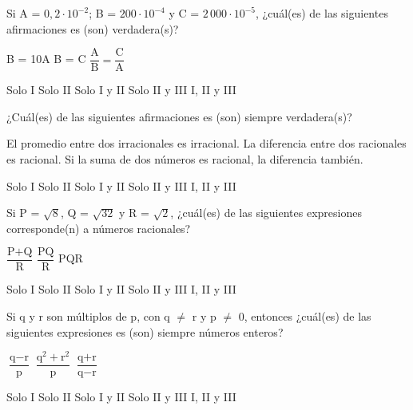 \documentclass[pagina vacia]{srs}
\begin{document}
\begin{preguntas}[after-item-skip=1cm]
\pregunta Si A = \(0,2 \cdot 10^{-2}\); B = \(200 \cdot 10^{-4}\) y C = \(2\,000 \cdot 10^{-5}\), ¿cuál(es) de las siguientes afirmaciones es (son) verdadera(s)?
\begin{verticali}
\alternativa B = 10A
\alternativa B = C
\alternativa \( \dfrac{\text{A}}{\text{B}} = \dfrac{\text{C}}{\text{A}} \)
\end{verticali}
\begin{vertical}
\alternativa Solo I
\alternativa Solo II
\alternativa Solo I y II
\alternativa Solo II y III
\alternativa I, II y III
\end{vertical}

\pregunta ¿Cuál(es) de las siguientes afirmaciones es (son) siempre verdadera(s)?
\begin{verticali}
\alternativa El promedio entre dos irracionales es irracional.
\alternativa La diferencia entre dos racionales es racional.
\alternativa Si la suma de dos números es racional, la diferencia también.
\end{verticali}
\begin{vertical}
\alternativa Solo I
\alternativa Solo II
\alternativa Solo I y II
\alternativa Solo II y III
\alternativa I, II y III
\end{vertical}

\pregunta Si P = \(\sqrt{8}\), Q = \(\sqrt{32}\) y R = \(\sqrt{2}\), ¿cuál(es) de las siguientes expresiones corresponde(n) a números racionales?
\begin{verticali}
\alternativa \( \dfrac{\text{P+Q}}{\text{R}} \)
\alternativa \( \dfrac{\text{PQ}}{\text{R}} \)
\alternativa PQR
\end{verticali}
\begin{vertical}
\alternativa Solo I
\alternativa Solo II
\alternativa Solo I y II
\alternativa Solo II y III
\alternativa I, II y III
\end{vertical}

\pregunta Si q y r son múltiplos de p, con q \( \neq \) r y p \( \neq \) 0, entonces ¿cuál(es) de las siguientes expresiones es (son) siempre números enteros?
\begin{verticali}
\alternativa \( \dfrac{\text{q}-\text{r}}{\text{p}} \)
\alternativa \( \dfrac{\text{q}^2 + \text{r}^2}{\text{p}} \)
\alternativa \( \dfrac{\text{q}+\text{r}}{\text{q}-\text{r}} \)
\end{verticali}
\begin{vertical}
\alternativa Solo I
\alternativa Solo II
\alternativa Solo I y II
\alternativa Solo II y III
\alternativa I, II y III
\end{vertical}


\end{preguntas}
\end{document}
